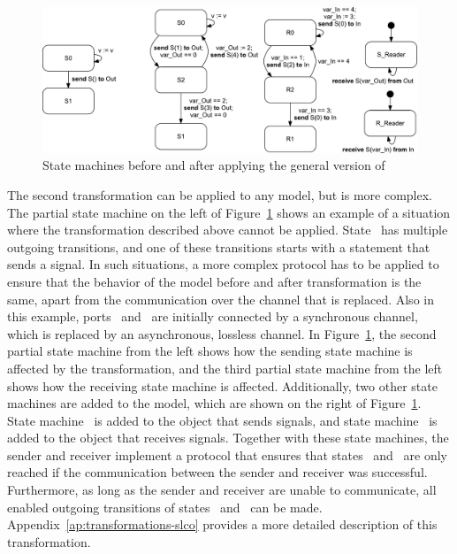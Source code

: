 \begin{figure}[hbt]
  \centering
  \includegraphics[scale=0.45]{slco/figs/transformations/s2a_complex}
  \caption{State machines before and after applying the general version of }
  \label{fig:slco:trans:ascomplex}
\end{figure}

The second transformation can be applied to any \SLCO model, but is more complex.
The partial state machine on the left of Figure~\ref{fig:slco:trans:ascomplex} shows an example of a situation where the transformation described above cannot be applied.
State~ has multiple outgoing transitions, and one of these transitions starts with a statement that sends a signal.
In such situations, a more complex protocol has to be applied to ensure that the behavior of the model before and after transformation is the same, apart from the communication over the channel that is replaced.
Also in this example, ports~ and~ are initially connected by a synchronous channel, which is replaced by an asynchronous, lossless channel.
In Figure~\ref{fig:slco:trans:ascomplex}, the second partial state machine from the left shows how the sending state machine is affected by the transformation, and the third partial state machine from the left shows how the receiving state machine is affected.
Additionally, two other state machines are added to the model, which are shown on the right of Figure~\ref{fig:slco:trans:ascomplex}.
State machine~ is added to the object that sends signals, and state machine~ is added to the object that receives signals.
Together with these state machines, the sender and receiver implement a protocol that ensures that states~ and~ are only reached if the communication between the sender and receiver was successful.
Furthermore, as long as the sender and receiver are unable to communicate, all enabled outgoing transitions of states~ and~ can be made.
Appendix~\ref{ap:transformations-slco} provides a more detailed description of this transformation.

